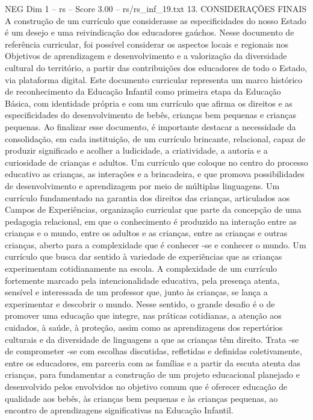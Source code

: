 \begin{textsample}{NEG Dim 1 – rs – Score 3.00 – rs/rs\_inf\_19.txt}  \label{ex:f1_neg_088}
13.
CONSIDERAÇÕES FINAIS A construção de um currículo que considerasse as especificidades do nosso Estado é um desejo e uma reivindicação dos educadores gaúchos.
Nesse documento de referência curricular, foi possível considerar os aspectos locais e regionais nos Objetivos de aprendizagem e desenvolvimento e a valorização da diversidade cultural do território, a partir das contribuições dos educadores de todo o Estado, via plataforma digital.
Este documento curricular representa um marco histórico de reconhecimento da Educação Infantil como primeira etapa da Educação Básica, com identidade própria e com um currículo que afirma os direitos e as especificidades do desenvolvimento de bebês, crianças bem pequenas e crianças pequenas.
Ao finalizar esse documento, é importante destacar a necessidade da consolidação, em cada instituição, de um currículo brincante, relacional, capaz de produzir significado e acolher a ludicidade, a criatividade, a autoria e a curiosidade de crianças e adultos.
Um currículo que coloque no centro do processo educativo as crianças, as interações e a brincadeira, e que promova possibilidades de desenvolvimento e aprendizagem por meio de múltiplas linguagens.
Um currículo fundamentado na garantia dos direitos das crianças, articulados aos Campos de Experiências, organização curricular que parte da concepção de uma pedagogia relacional, em que o conhecimento é produzido na interação entre as crianças e o mundo, entre os adultos e as crianças, entre as crianças e outras crianças, aberto para a complexidade que é conhecer -se e conhecer o mundo.
Um currículo que busca dar sentido à variedade de experiências que as crianças experimentam cotidianamente na escola.
A complexidade de um currículo fortemente marcado pela intencionalidade educativa, pela presença atenta, sensível e interessada de um professor que, junto às crianças, se lança a experimentar e descobrir o mundo.
Nesse sentido, o grande desafio é o de promover uma educação que integre, nas práticas cotidianas, a atenção aos cuidados, à saúde, à proteção, assim como as aprendizagens dos repertórios culturais e da diversidade de linguagens a que as crianças têm direito.
Trata -se de comprometer -se com escolhas discutidas, refletidas e definidas coletivamente, entre os educadores, em parceria com as famílias e a partir da escuta atenta das crianças, para fundamentar a construção de um projeto educacional planejado e desenvolvido pelos envolvidos no objetivo comum que é oferecer educação de qualidade aos bebês, às crianças bem pequenas e às crianças pequenas, ao encontro de aprendizagens significativas na Educação Infantil.

\end{textsample}
